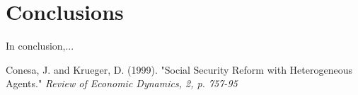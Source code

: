 \documentclass[11pt, a4paper, leqno]{article}
\begin{document}
\clearpage

\section{Conclusions}
In conclusion,... 

\clearpage

\begin{thebibliography}{}

\bibitem{} \hypertarget{Conesa and Kruger 1999}{Conesa, J. and Krueger, D. (1999).} "Social 
    Security Reform with Heterogeneous Agents." \textit{Review of Economic Dynamics, 2, p. 757-95}\
\end{thebibliography}
\end{document}
